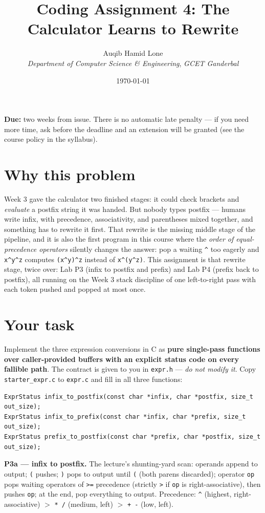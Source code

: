 \documentclass[11pt]{article}
\title{Coding Assignment 4: The Calculator Learns to Rewrite}
\author{Auqib Hamid Lone\\[0.3em]
  \emph{Department of Computer Science \& Engineering}, \emph{GCET Ganderbal}}
\date{\today}
\begin{document}
\maketitle

\noindent\textbf{Due:} two weeks from issue. There is no automatic late penalty --- if you need more time, ask before the deadline and an extension will be granted (see the course policy in the syllabus).

\section{Why this problem}

Week 3 gave the calculator two finished stages: it could check brackets and \emph{evaluate} a postfix string it was handed. But nobody types postfix --- humans write infix, with precedence, associativity, and parentheses mixed together, and something has to rewrite it first. That rewrite is the missing middle stage of the pipeline, and it is also the first program in this course where the \emph{order of equal-precedence operators} silently changes the answer: pop a waiting \texttt{\^{}} too eagerly and \texttt{x\^{}y\^{}z} computes \texttt{(x\^{}y)\^{}z} instead of \texttt{x\^{}(y\^{}z)}. This assignment is that rewrite stage, twice over: Lab P3 (infix to postfix and prefix) and Lab P4 (prefix back to postfix), all running on the Week 3 stack discipline of one left-to-right pass with each token pushed and popped at most once.

\section{Your task}

Implement the three expression conversions in C as \textbf{pure single-pass functions over caller-provided buffers with an explicit status code on every fallible path}. The contract is given to you in \texttt{expr.h} --- \emph{do not modify it}. Copy \texttt{starter\_expr.c} to \texttt{expr.c} and fill in all three functions:

\begin{verbatim}
ExprStatus infix_to_postfix(const char *infix, char *postfix, size_t out_size);
ExprStatus infix_to_prefix(const char *infix, char *prefix, size_t out_size);
ExprStatus prefix_to_postfix(const char *prefix, char *postfix, size_t out_size);
\end{verbatim}

\textbf{P3a --- infix to postfix.} The lecture's shunting-yard scan: operands append to output; \texttt{(} pushes; \texttt{)} pops to output until \texttt{(} (both parens discarded); operator \texttt{op} pops waiting operators of \texttt{>=} precedence (strictly \texttt{>} if \texttt{op} is right-associative), then pushes \texttt{op}; at the end, pop everything to output. Precedence: \texttt{\^{}} (highest, right-associative) $>$ \texttt{* /} (medium, left) $>$ \texttt{+ -} (low, left).
\end{document}
